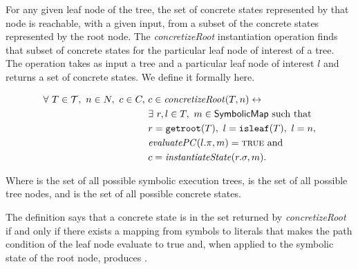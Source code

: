 \begin{mydefinition}
  \label{def:concroot}
  
  For any given leaf node of the
  tree, the set of concrete states represented by that node is reachable, with a
  given input, from a subset of the concrete states represented by the root
  node. The \emph{concretizeRoot} instantiation operation finds that subset of concrete states
  for the particular leaf node of interest of a tree. The operation takes as
  input a tree \tree{} and a particular leaf node of interest $l$ and returns
  a set of concrete states. We define it formally here. 


  \begin{align*}
\forall~ T \in \mathcal{T},~n \in N,~ c \in C,~& c \in
\mathit{concretizeRoot}(T,n) \leftrightarrow \\
&\exists~ r,l \in T,~m \in \textsf{SymbolicMap} \mathrm{~such~that}\\
&r = \mathtt{getroot}(T),~ l = \mathtt{isleaf}(T),~ l = n,\\
&\mathit{evaluatePC}(l.\pi, m) = \mathtt{\textsc{true}}~ \mathrm{and} \\
&c = \mathit{instantiateState}(r.\sigma, m).
    \end{align*}
\end{mydefinition}



Where \trees{} is the set of all possible symbolic execution trees, \nodes{} is
the set of all possible tree nodes, and
\concstates{} is the set of all possible concrete states.

The definition says that a concrete state \concstate{} is in the set returned by
\emph{concretizeRoot} if and only if there exists a mapping from symbols to
literals that makes the path condition of the leaf node evaluate to true
and, when applied to the symbolic state of the root node, produces
\concstate{}. 

